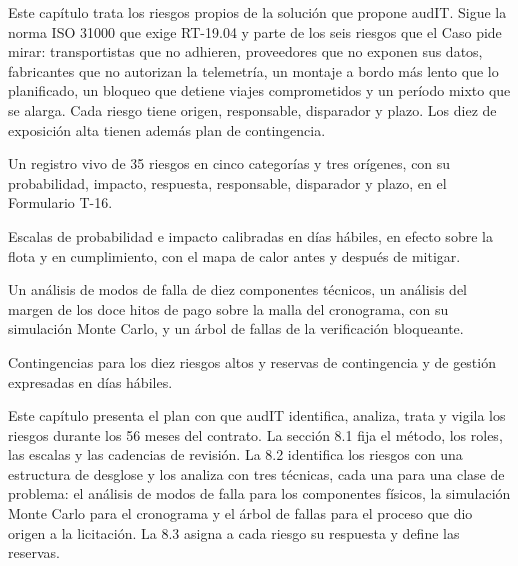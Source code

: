 %

\begin{resumenApertura}
Este capítulo trata los riesgos propios de la solución que propone audIT. Sigue la norma ISO 31000 que exige RT-19.04 y parte de los seis riesgos que el Caso pide mirar:
transportistas que no adhieren, proveedores que no exponen sus datos, fabricantes que no autorizan la
telemetría, un montaje a bordo más lento que lo planificado, un bloqueo que detiene viajes comprometidos
y un período mixto que se alarga. Cada riesgo tiene origen, responsable, disparador y plazo. Los diez de
exposición alta tienen además plan de contingencia.
\begin{recibe}
  \item Un registro vivo de 35 riesgos en cinco categorías y tres orígenes, con su probabilidad, impacto, respuesta, responsable, disparador y plazo, en el Formulario T-16.
  \item Escalas de probabilidad e impacto calibradas en días hábiles, en efecto sobre la flota y en cumplimiento, con el mapa de calor antes y después de mitigar.
  \item Un análisis de modos de falla de diez componentes técnicos, un análisis del margen de los doce hitos de pago sobre la malla del cronograma, con su simulación Monte Carlo, y un árbol de fallas de la verificación bloqueante.
  \item Contingencias para los diez riesgos altos y reservas de contingencia y de gestión expresadas en días hábiles.
\end{recibe}
\end{resumenApertura}

Este capítulo presenta el plan con que audIT identifica, analiza, trata y vigila los riesgos durante los
56 meses del contrato. La sección 8.1 fija el método, los roles, las escalas y las cadencias de revisión.
La 8.2 identifica los riesgos con una estructura de desglose y los analiza con tres técnicas, cada una
para una clase de problema: el análisis de modos de falla para los componentes físicos, la simulación
Monte Carlo para el cronograma y el árbol de fallas para el proceso que dio origen a la licitación. La
8.3 asigna a cada riesgo su respuesta y define las reservas.

